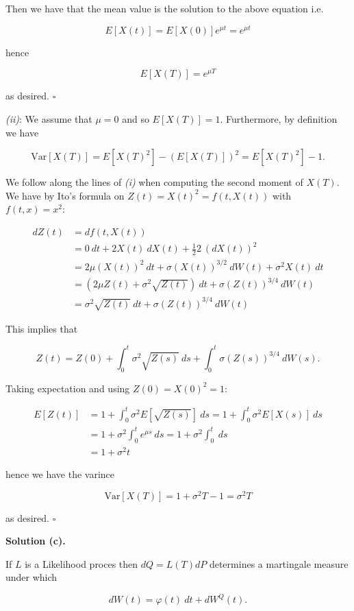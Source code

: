 \documentclass[
]{book}
\begin{document}
Then we have that the mean value is the solution to the above equation i.e.

\[
E[X(t)]=E[X(0)]e^{\mu t}=e^{\mu t}
\]

hence

\[
E[X(T)]=e^{\mu T}
\]

as desired. \(\square\)

\emph{(ii)}: We assume that \(\mu =0\) and so \(E[X(T)]=1\). Furthermore, by definition we have

\[
\text{Var}[X(T)]=E[X(T)^2]-(E[X(T)])^2=E[X(T)^2]-1.
\]

We follow along the lines of \emph{(i)} when computing the second moment of \(X(T)\). We have by Ito's formula on \(Z(t)=X(t)^2=f(t,X(t))\) with \(f(t,x)=x^2\):

\begin{align*}
dZ(t)&=df(t,X(t))\\
&=0\ dt+ 2X(t)\ dX(t)+\frac{1}{2}2\ (dX(t))^2\\
&=2\mu (X(t))^2 \ dt+\sigma (X(t))^{3/2}\ dW(t)+\sigma^2 X(t)\ dt\\
&=\left(2\mu Z(t)+\sigma^2 \sqrt{Z(t)}\right)\ dt +\sigma (Z(t))^{3/4}\ dW(t)\\
&=\sigma^2 \sqrt{Z(t)}\ dt +\sigma (Z(t))^{3/4}\ dW(t)
\end{align*}

This implies that

\[
Z(t)=Z(0)+\int_0^t\sigma^2 \sqrt{Z(s)}\ ds+\int_0^t\sigma (Z(s))^{3/4}\ dW(s).
\]

Taking expectation and using \(Z(0)=X(0)^2=1\):

\begin{align*}
E[Z(t)]&=1+\int_0^t\sigma^2 E\left[\sqrt{Z(s)}\right]\ ds=1+\int_0^t\sigma^2 E\left[X(s)\right]\ ds\\
&=1+\sigma^2\int_0^t e^{\mu s}\ ds=1+\sigma^2\int_0^t\ ds\\
&=1+\sigma^2t
\end{align*}

hence we have the varince

\[
\text{Var}[X(T)]=1+\sigma^2T-1=\sigma^2T
\]

as desired. \(\square\)

\noindent\makebox[\linewidth]{\rule{\textwidth}{0.4pt}}

\textbf{Solution (c).}

If \(L\) is a Likelihood proces then \(dQ=L(T)dP\) determines a martingale measure under which

\[
dW(t)=\varphi(t)\ dt+dW^Q(t).
\]
\end{document}
